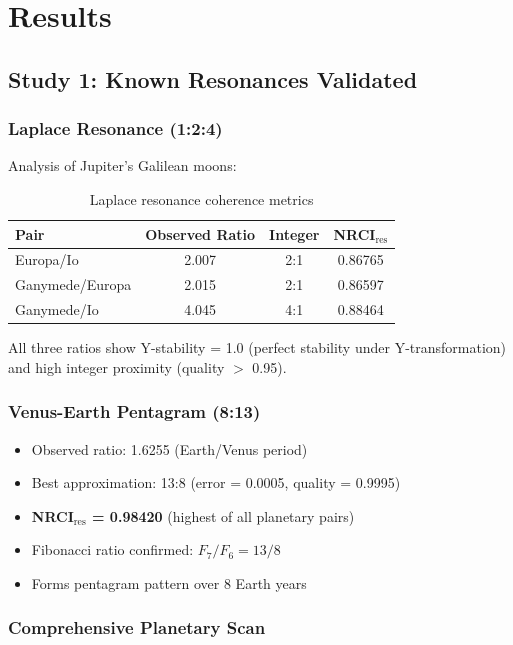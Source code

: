 \documentclass[12pt,a4paper]{article}
\begin{document}
\section{Results}

\subsection{Study 1: Known Resonances Validated}

\subsubsection{Laplace Resonance (1:2:4)}

Analysis of Jupiter's Galilean moons:

\begin{table}[h]
\centering
\begin{tabular}{lccc}
\hline
\textbf{Pair} & \textbf{Observed Ratio} & \textbf{Integer} & \textbf{NRCI$_{\text{res}}$} \\
\hline
Europa/Io & 2.007 & 2:1 & 0.86765 \\
Ganymede/Europa & 2.015 & 2:1 & 0.86597 \\
Ganymede/Io & 4.045 & 4:1 & 0.88464 \\
\hline
\end{tabular}
\caption{Laplace resonance coherence metrics}
\end{table}

All three ratios show Y-stability = 1.0 (perfect stability under Y-transformation) and high integer proximity (quality $>$ 0.95).

\subsubsection{Venus-Earth Pentagram (8:13)}

\begin{itemize}
\item Observed ratio: 1.6255 (Earth/Venus period)
\item Best approximation: 13:8 (error = 0.0005, quality = 0.9995)
\item \textbf{NRCI$_{\text{res}}$ = 0.98420} (highest of all planetary pairs)
\item Fibonacci ratio confirmed: $F_7/F_6 = 13/8$
\item Forms pentagram pattern over 8 Earth years
\end{itemize}

\subsubsection{Comprehensive Planetary Scan}
\end{document}
